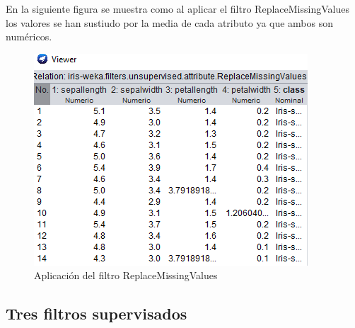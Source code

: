 \begin{itemize}
En la siguiente figura se muestra como al aplicar el filtro ReplaceMissingValues los valores se han sustiudo por la media de cada atributo ya que ambos son numéricos.
 \begin{figure}[H]
    \centering
    \includegraphics[width=\textwidth]{img/ARP.PNG}
    \caption{Aplicación del filtro ReplaceMissingValues}
\end{figure}

\end{itemize}

\subsection{Tres filtros supervisados}

